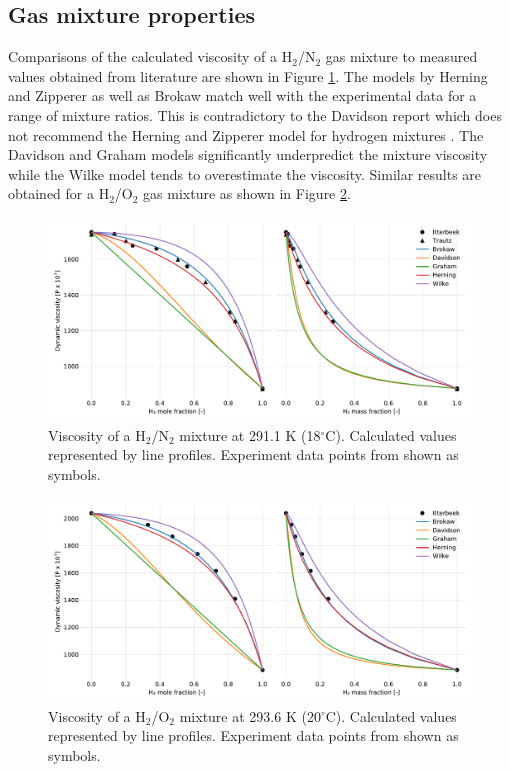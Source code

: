 \documentclass{article}
\begin{document}
\subsection{Gas mixture properties}

Comparisons of the calculated viscosity of a H$_2$/N$_2$ gas mixture to measured values obtained from literature are shown in Figure \ref{fig:gas-mu-h2n2-validate}. The models by Herning and Zipperer as well as Brokaw match well with the experimental data for a range of mixture ratios. This is contradictory to the Davidson report which does not recommend the Herning and Zipperer model for hydrogen mixtures \cite{Davidson-1993}. The Davidson and Graham models significantly underpredict the mixture viscosity while the Wilke model tends to overestimate the viscosity. Similar results are obtained for a H$_2$/O$_2$ gas mixture as shown in Figure \ref{fig:gas-mu-h2o2-validate}.

\begin{figure}[H]
    \centering
    \includegraphics[width=\textwidth]{figures/gas-mu-h2n2-validate.pdf}
    \caption{Viscosity of a H$_2$/N$_2$ mixture at 291.1 K (18$^\circ$C). Calculated values represented by line profiles. Experiment data points from \cite{Itterbeek-1947,Trautz-1929} shown as symbols.}
    \label{fig:gas-mu-h2n2-validate}
\end{figure}

\begin{figure}[H]
    \centering
    \includegraphics[width=\textwidth]{figures/gas-mu-h2o2-validate.pdf}
    \caption{Viscosity of a H$_2$/O$_2$ mixture at 293.6 K (20$^\circ$C). Calculated values represented by line profiles. Experiment data points from \cite{Itterbeek-1947} shown as symbols.}
    \label{fig:gas-mu-h2o2-validate}
\end{figure}
\end{document}
